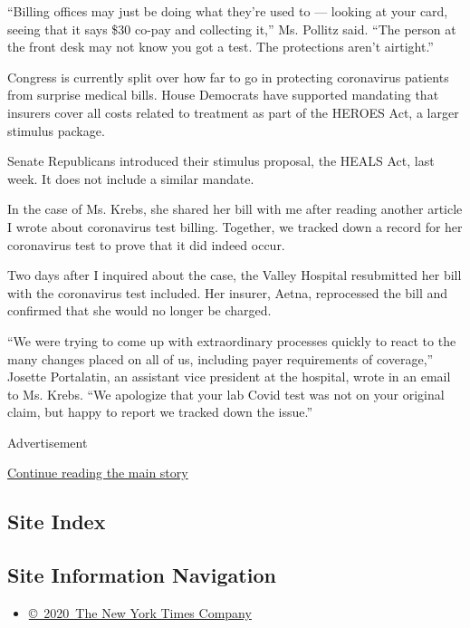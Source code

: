 ``Billing offices may just be doing what they're used to --- looking at
your card, seeing that it says \$30 co-pay and collecting it,'' Ms.
Pollitz said. ``The person at the front desk may not know you got a
test. The protections aren't airtight.''

Congress is currently split over how far to go in protecting coronavirus
patients from surprise medical bills. House Democrats have supported
mandating that insurers cover all costs related to treatment as part of
the HEROES Act, a larger stimulus package.

Senate Republicans introduced their stimulus proposal, the HEALS Act,
last week. It does not include a similar mandate.

In the case of Ms. Krebs, she shared her bill with me after reading
another article I wrote about coronavirus test billing. Together, we
tracked down a record for her coronavirus test to prove that it did
indeed occur.

Two days after I inquired about the case, the Valley Hospital
resubmitted her bill with the coronavirus test included. Her insurer,
Aetna, reprocessed the bill and confirmed that she would no longer be
charged.

``We were trying to come up with extraordinary processes quickly to
react to the many changes placed on all of us, including payer
requirements of coverage,'' Josette Portalatin, an assistant vice
president at the hospital, wrote in an email to Ms. Krebs. ``We
apologize that your lab Covid test was not on your original claim, but
happy to report we tracked down the issue.''

Advertisement

\protect\hyperlink{after-bottom}{Continue reading the main story}

\hypertarget{site-index}{%
\subsection{Site Index}\label{site-index}}

\hypertarget{site-information-navigation}{%
\subsection{Site Information
Navigation}\label{site-information-navigation}}

\begin{itemize}
\tightlist
\item
  \href{https://help.nytimes.com/hc/en-us/articles/115014792127-Copyright-notice}{©~2020~The
  New York Times Company}
\end{itemize}

